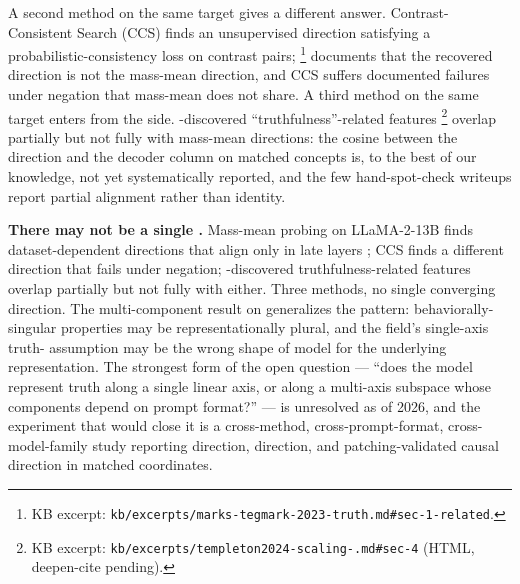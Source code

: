 A second method on the same target gives a different answer.
Contrast-Consistent Search (CCS)
 finds an
unsupervised direction satisfying a probabilistic-consistency loss
on contrast pairs; \citet[\S 1 related work]{marks-tegmark-2023-truth}\footnote{KB
excerpt: \texttt{kb/excerpts/marks-tegmark-2023-truth.md\#sec-1-related}.}
documents that the recovered direction is not the mass-mean
direction, and CCS suffers documented failures under negation that
mass-mean does not share. A third method on the same target enters from the  side.
-discovered ``truthfulness''-related features
\citep[\S 4]{templeton2024-scaling-monosemanticity}\footnote{KB
excerpt: \texttt{kb/excerpts/templeton2024-scaling-.md\#sec-4}
(HTML, deepen-cite pending).} 
overlap partially but not fully with mass-mean directions: the
cosine between the  direction and the   decoder
column on matched concepts is, to the best of our knowledge, not
yet systematically reported, and the few hand-spot-check writeups
report partial alignment rather than identity.

\begin{contradiction}
\textbf{There may not be a single .} Mass-mean
probing on LLaMA-2-13B finds dataset-dependent directions that align
only in late layers \citep[\S 4]{marks-tegmark-2023-truth}; CCS
finds a different direction that fails under negation; -discovered
truthfulness-related features overlap partially but not fully with
either. Three methods, no single converging direction. The
\citet{vennemeyer2025-sycophancy-not-one-thing} multi-component
result on  generalizes the pattern: behaviorally-singular
properties may be representationally plural, and the field's
single-axis truth- assumption may be the wrong shape of model
for the underlying representation. The strongest form of the open
question --- ``does the model represent truth along a single linear
axis, or along a multi-axis subspace whose components depend on
prompt format?'' --- is unresolved as of 2026, and the experiment
that would close it is a cross-method, cross-prompt-format,
cross-model-family study reporting  direction,  
direction, and patching-validated causal direction in matched
coordinates.
\end{contradiction}

